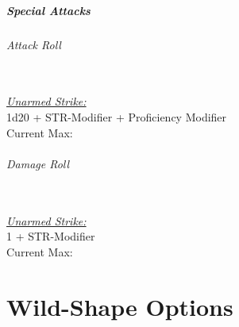 \documentclass[letterpaper,openany,oneside,twocolumn]{book}
\begin{document}
\subsubsection*{Special Attacks}
\paragraph*{Attack Roll}\hfill\\
\underline{\textit{Unarmed Strike:}}\\
1d20 + STR-Modifier + Proficiency Modifier\\
\indent Current Max: 
\paragraph*{Damage Roll}\hfill\\
\underline{\textit{Unarmed Strike:}}\\
1 + STR-Modifier\\
\indent Current Max: 


\part*{Wild-Shape Options}
\end{document}
